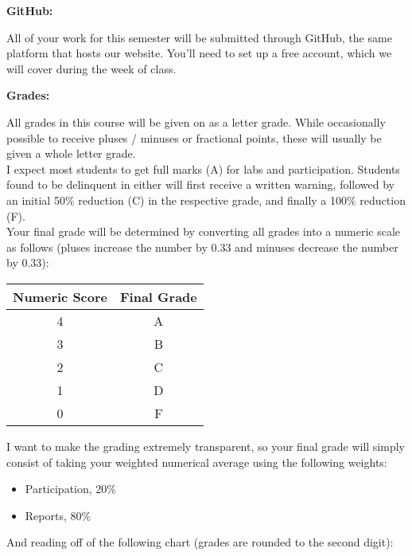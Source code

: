 \documentclass[12pt]{article}
\begin{document}
\vspace{0.4cm}

\textbf{GitHub:} \vspace{6pt}

All of your work for this semester will be submitted through GitHub,
the same platform that hosts our website. You'll need to set up a free
account, which we will cover during the week of class.

\vspace{0.4cm}

\textbf{Grades:} \vspace{6pt}

All grades in this course will be given on as a letter grade.
While occasionally possible to receive pluses / minuses or
fractional points, these will usually be given a whole letter grade. \\

I expect most students to get full marks (A) for labs and participation.
Students found to be delinquent in either will first receive a written
warning, followed by an initial 50\% reduction (C) in the respective grade,
and finally a 100\% reduction (F). \\

Your final grade will be determined by converting all grades into
a numeric scale as follows (pluses increase the number by 0.33 and minuses
decrease the number by 0.33):

\begin{center}
\begin{tabular}{c || c}
Numeric Score & Final Grade \\
\hline \hline
4 & A  \\
3 & B  \\
2 & C  \\
1 & D  \\
0 & F
\end{tabular}
\end{center}

I want to make the grading extremely transparent, so your final grade will
simply consist of taking your weighted numerical average using the following
weights:

\begin{itemize}\setlength\itemsep{0em}
\item Participation, 20\%
\item Reports, 80\%
\end{itemize}

And reading off of the following chart (grades are rounded to the
second digit):
\end{document}
